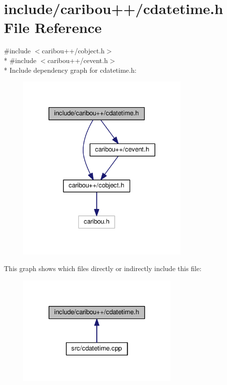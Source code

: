 \section{include/caribou++/cdatetime.h File Reference}
\label{cdatetime_8h}
{\ttfamily \#include $<$caribou++/cobject.\-h$>$}\\*
{\ttfamily \#include $<$caribou++/cevent.\-h$>$}\\*
Include dependency graph for cdatetime.\-h\-:\nopagebreak
\begin{figure}[H]
\begin{center}
\leavevmode
\includegraphics[width=244pt]{cdatetime_8h__incl}
\end{center}
\end{figure}
This graph shows which files directly or indirectly include this file\-:\nopagebreak
\begin{figure}[H]
\begin{center}
\leavevmode
\includegraphics[width=228pt]{cdatetime_8h__dep__incl}
\end{center}
\end{figure}
